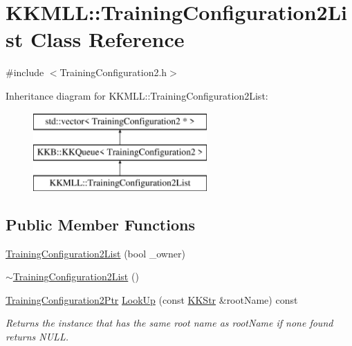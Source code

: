 \hypertarget{class_k_k_m_l_l_1_1_training_configuration2_list}{}\section{K\+K\+M\+LL\+:\+:Training\+Configuration2\+List Class Reference}
\label{class_k_k_m_l_l_1_1_training_configuration2_list}


{\ttfamily \#include $<$Training\+Configuration2.\+h$>$}

Inheritance diagram for K\+K\+M\+LL\+:\+:Training\+Configuration2\+List\+:\begin{figure}[H]
\begin{center}
\leavevmode
\includegraphics[height=3.000000cm]{class_k_k_m_l_l_1_1_training_configuration2_list}
\end{center}
\end{figure}
\subsection*{Public Member Functions}
\begin{DoxyCompactItemize}
\item 
\hyperlink{class_k_k_m_l_l_1_1_training_configuration2_list_a8cbbe61f5e4a31f3a9ba403d3da06b24}{Training\+Configuration2\+List} (bool \+\_\+owner)
\item 
\hyperlink{class_k_k_m_l_l_1_1_training_configuration2_list_a9a1c4752e07949c62be04faaaeb21b9f}{$\sim$\+Training\+Configuration2\+List} ()
\item 
\hyperlink{namespace_k_k_m_l_l_a5da4b334417f8c9e4e2fd5924da7fe62}{Training\+Configuration2\+Ptr} \hyperlink{class_k_k_m_l_l_1_1_training_configuration2_list_acc0d039efe54a8db580dc7a8ad35ad65}{Look\+Up} (const \hyperlink{class_k_k_b_1_1_k_k_str}{K\+K\+Str} \&root\+Name) const 
\begin{DoxyCompactList}\small\item\em Returns the instance that has the same root name as \textquotesingle{}root\+Name\textquotesingle{} if none found returns N\+U\+LL. \end{DoxyCompactList}\end{DoxyCompactItemize}

